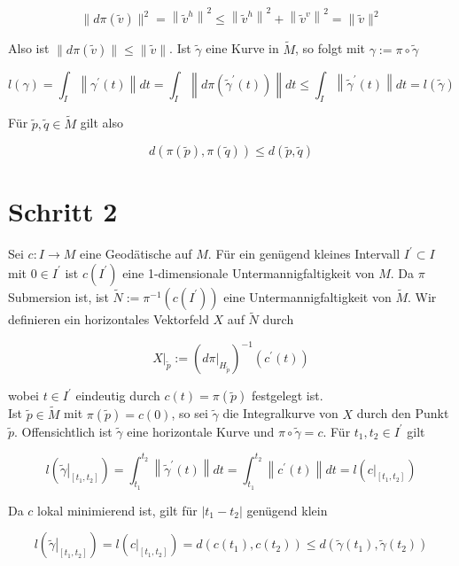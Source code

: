 \documentclass[10pt, letterpaper]{article}
\begin{document}
$$
\|d \pi(\tilde{v})\|^{2}=\left\|\tilde{v}^{h}\right\|^{2} \leq\left\|\tilde{v}^{h}\right\|^{2}+\left\|\tilde{v}^{v}\right\|^{2}=\|\tilde{v}\|^{2}
$$

Also ist $\|d \pi(\tilde{v})\| \leq\|\tilde{v}\|$. Ist $\tilde{\gamma}$ eine Kurve in $\tilde{M}$, so folgt mit $\gamma:=\pi \circ \tilde{\gamma}$

$$
l(\gamma)=\int_{I}\left\|\gamma^{\prime}(t)\right\| d t=\int_{I}\left\|d \pi\left(\tilde{\gamma}^{\prime}(t)\right)\right\| d t \leq \int_{I}\left\|\tilde{\gamma}^{\prime}(t)\right\| d t=l(\tilde{\gamma})
$$

Für $\tilde{p}, \tilde{q} \in \tilde{M}$ gilt also

$$
d(\pi(\tilde{p}), \pi(\tilde{q})) \leq d(\tilde{p}, \tilde{q})
$$

\section*{Schritt 2}
Sei $c: I \rightarrow M$ eine Geodätische auf $M$. Für ein genügend kleines Intervall $I^{\prime} \subset I$ mit $0 \in I^{\prime}$ ist $c\left(I^{\prime}\right)$ eine 1-dimensionale Untermannigfaltigkeit von $M$. Da $\pi$ Submersion ist, ist $\tilde{N}:=\pi^{-1}\left(c\left(I^{\prime}\right)\right)$ eine Untermannigfaltigkeit von $\tilde{M}$. Wir definieren ein horizontales Vektorfeld $X$ auf $\tilde{N}$ durch

$$
\left.X\right|_{\tilde{p}}:=\left(\left.d \pi\right|_{H_{\tilde{p}}}\right)^{-1}\left(c^{\prime}(t)\right)
$$

wobei $t \in I^{\prime}$ eindeutig durch $c(t)=\pi(\tilde{p})$ festgelegt ist.\\
Ist $\tilde{p} \in \tilde{M}$ mit $\pi(\tilde{p})=c(0)$, so sei $\tilde{\gamma}$ die Integralkurve von $X$ durch den Punkt $\tilde{p}$. Offensichtlich ist $\tilde{\gamma}$ eine horizontale Kurve und $\pi \circ \tilde{\gamma}=c$. Für $t_{1}, t_{2} \in I^{\prime}$ gilt

$$
l\left(\left.\tilde{\gamma}\right|_{\left[t_{1}, t_{2}\right]}\right)=\int_{t_{1}}^{t_{2}}\left\|\tilde{\gamma}^{\prime}(t)\right\| d t=\int_{t_{1}}^{t_{2}}\left\|c^{\prime}(t)\right\| d t=l\left(\left.c\right|_{\left[t_{1}, t_{2}\right]}\right)
$$

Da $c$ lokal minimierend ist, gilt für $\left|t_{1}-t_{2}\right|$ genügend klein

$$
l\left(\left.\tilde{\gamma}\right|_{\left[t_{1}, t_{2}\right]}\right)=l\left(\left.c\right|_{\left[t_{1}, t_{2}\right]}\right)=d\left(c\left(t_{1}\right), c\left(t_{2}\right)\right) \leq d\left(\tilde{\gamma}\left(t_{1}\right), \tilde{\gamma}\left(t_{2}\right)\right)
$$
\end{document}
